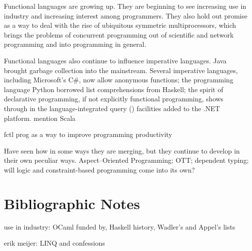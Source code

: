 \label{conclusion:forward}
Functional languages are growing up. They are beginning to see increasing use in industry and increasing interest among programmers. They also hold out promise as a way to deal with the rise of ubiquitous symmetric multiprocessors, which brings the problems of concurrent programming out of scientific and network programming and into programming in general.

Functional languages also continue to influence imperative languages. Java brought garbage collection into the mainstream. Several imperative languages, including Microsoft's C\#, now allow anonymous functions; the programming language Python borrowed list comprehensions from Haskell; the spirit of declarative programming, if not explicitly functional programming, shows through in the language-integrated query () facilities added to the .NET platform. mention Scala

fctl prog as a way to improve programming productivity

Have seen how in some ways they are merging, but they continue to develop in their own peculiar ways. Aspect--Oriented Programming; OTT; dependent typing; will logic and constraint-based programming come into its own?

\section{Bibliographic Notes}
use in industry: OCaml funded by, Haskell history, Wadler's and Appel's lists

erik meijer: LINQ and confessions